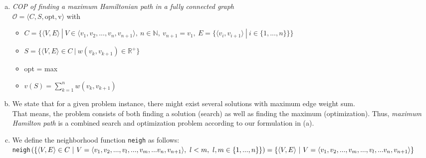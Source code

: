 \documentclass{article} %
\begin{document}
\section{}
\begin{enumerate}[(a)]
    \item \textit{COP of finding a maximum Hamiltonian
    path in a fully connected graph}\\[0.5em]
    $\mathcal{O} = \langle C, S, \text{opt}, \text{v} \rangle$ with
    \begin{itemize}
        \item $C = \{
            \langle V, E \rangle \ | \
            V \in \langle v_1, v_2, ..., v_n, v_{n+1} \rangle, \
            n \in \mathbb{N}, \
            v_{n+1} = v_1, \
            E = \{ \langle v_i, v_{i+1} \rangle \ | \ i \in \{ 1, ..., n \} \}
        \}$
        \item $S = \{
            \langle V, E \rangle \in C \ | \
            w(v_k, v_{k+1}) \in \mathbb{R^+}
            \}$
        \item opt = max
        \item $v(S) = \sum_{k=1}^{n} w(v_k, v_{k+1}) $
    \end{itemize}
    \item We state that for a given problem instance, there might exist several solutions with maximum edge weight sum.\\
    That means, the problem consists of both finding a solution (search) as well as
    finding the maximum (optimization). Thus, \textit{maximum Hamilton path}
    is a combined search and optimization problem according to our formulation in (a).
    \item We define the neighborhood function \texttt{neigh} as follows:\\[0.5em]
    \texttt{neigh}$(
        \{
            \langle V, E \rangle \in C \ | \
            V = \langle v_1, v_2, ..., v_l, ..., v_m, ... v_n, v_{n+1} \rangle , \
            l < m, \
            l, m \in \{ 1, ..., n \}
        \}
        ) \\[0.4em]
    = \{
        \langle V, E \rangle \ | \
        V = \langle v_1, v_2, ..., v_m, ..., v_l, ... v_n, v_{n+1} \rangle
    \}$
\end{enumerate}

\section{}

\end{document}
